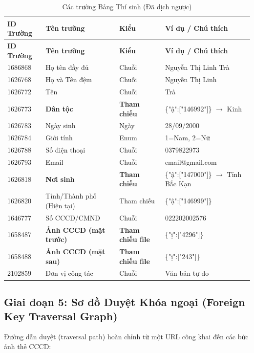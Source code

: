 \documentclass[12pt,a4paper]{article}
\begin{document}
\begin{longtable}{@{}lllp{4cm}@{}}
\caption{Các trường Bảng Thí sinh (Đã dịch ngược)} \\
\toprule
\textbf{ID Trường} & \textbf{Tên trường} & \textbf{Kiểu} & \textbf{Ví dụ / Chú thích} \\
\midrule
\endfirsthead
\toprule
\textbf{ID Trường} & \textbf{Tên trường} & \textbf{Kiểu} & \textbf{Ví dụ / Chú thích} \\
\midrule
\endhead
1686868 & Họ tên đầy đủ & Chuỗi & Nguyễn Thị Linh Trà \\
1626768 & Họ và Tên đệm & Chuỗi & Nguyễn Thị Linh \\
1626772 & Tên & Chuỗi & Trà \\
1626773 & \textbf{Dân tộc} & \textbf{Tham chiếu} & \{"ậ":["146992"]\} $\rightarrow$ Kinh \\
1626783 & Ngày sinh & Ngày & 28/09/2000 \\
1626784 & Giới tính & Enum & 1=Nam, 2=Nữ \\
1626788 & Số điện thoại & Chuỗi & 0379822973 \\
1626793 & Email & Chuỗi & email@gmail.com \\
1626818 & \textbf{Nơi sinh} & \textbf{Tham chiếu} & \{"ậ":["147000"]\} $\rightarrow$ Tỉnh Bắc Kạn \\
1626820 & Tỉnh/Thành phố (Hiện tại) & Tham chiếu & \{"ậ":["146999"]\} \\
1646777 & Số CCCD/CMND & Chuỗi & 022202002576 \\
1658487 & \textbf{Ảnh CCCD (mặt trước)} & \textbf{Tham chiếu file} & \{"ị":["4296"]\} \\
1658488 & \textbf{Ảnh CCCD (mặt sau)} & \textbf{Tham chiếu file} & \{"ị":["243"]\} \\
2102859 & Đơn vị công tác & Chuỗi & Văn bản tự do \\
\bottomrule
\end{longtable}

\subsection{Giai đoạn 5: Sơ đồ Duyệt Khóa ngoại (Foreign Key Traversal Graph)}

Đường dẫn duyệt (traversal path) hoàn chỉnh từ một URL công khai đến các bức ảnh thẻ CCCD:
\end{document}
